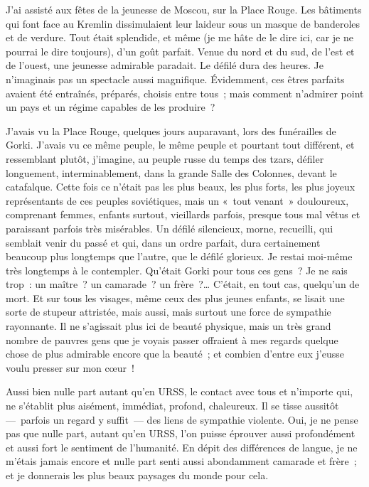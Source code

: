 \documentclass[french,twoside]{book} %
\begin{document}
J’ai assisté aux fêtes de la jeunesse de Moscou, sur la Place Rouge. Les bâtiments qui font face au Kremlin dissimulaient leur laideur sous un masque de banderoles et de verdure. Tout était splendide, et même (je me hâte de le dire ici, car je ne pourrai le dire toujours), d’un goût parfait. Venue du nord et du sud, de l’est et de l’ouest, une jeunesse admirable paradait. Le défilé dura des heures. Je n’imaginais pas un spectacle aussi magnifique. Évidemment, ces êtres parfaits avaient été entraînés, préparés, choisis entre tous ; mais comment n’admirer point un pays et un régime capables de les produire ?\par
J’avais vu la Place Rouge, quelques jours auparavant, lors des funérailles de Gorki. J’avais vu ce même peuple, le même peuple et pourtant tout différent, et ressemblant plutôt, j’imagine, au peuple russe du temps des tzars, défiler longuement, interminablement, dans la grande Salle des Colonnes, devant le catafalque. Cette fois ce n’était pas les plus beaux, les plus forts, les plus joyeux représentants de ces peuples soviétiques, mais un « tout venant » douloureux, comprenant femmes, enfants surtout, vieillards parfois, presque tous mal vêtus et paraissant parfois très misérables. Un défilé silencieux, morne, recueilli, qui semblait venir du passé et qui, dans un ordre parfait, dura certainement beaucoup plus longtemps que l’autre, que le défilé glorieux. Je restai moi-même très longtemps à le contempler. Qu’était Gorki pour tous ces gens ? Je ne sais trop : un maître ? un camarade ? un frère ?… C’était, en tout cas, quelqu’un de mort. Et sur tous les visages, même ceux des plus jeunes enfants, se lisait une sorte de stupeur attristée, mais aussi, mais surtout une force de sympathie rayonnante. Il ne s’agissait plus ici de beauté physique, mais un très grand nombre de pauvres gens que je voyais passer offraient à mes regards quelque chose de plus admirable encore que la beauté ; et combien d’entre eux j’eusse voulu presser sur mon cœur !\par
Aussi bien nulle part autant qu’en URSS, le contact avec tous et n’importe qui, ne s’établit plus aisément, immédiat, profond, chaleureux. Il se tisse aussitôt — parfois un regard y suffit — des liens de sympathie violente. Oui, je ne pense pas que nulle part, autant qu’en URSS, l’on puisse éprouver aussi profondément et aussi fort le sentiment de l’humanité. En dépit des différences de langue, je ne m’étais jamais encore et nulle part senti aussi abondamment camarade et frère ; et je donnerais les plus beaux paysages du monde pour cela.\par
\end{document}

